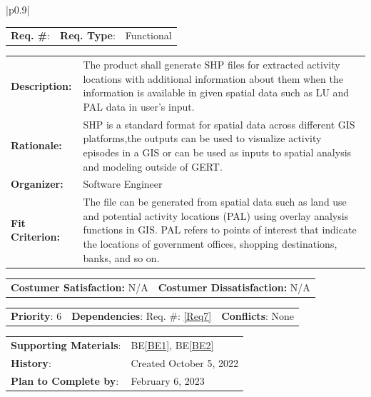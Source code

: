 \documentclass[12pt, titlepage]{article}
\newcommand{\beref}[1]{BE\ref{#1}}
\newcounter{reqnum}
\newcommand{\reqthereqnum}{\textbf{Req. \#}: \thereqnum}
\newcommand{\reqref}[1]{Req. \#: \ref{#1}}
\newenvironment{boxed}
    {\begin{center}
    \begin{tabular}{|p{0.9\textwidth}|}
    \hline\\
    }
    { 
    \\\\\hline
    \end{tabular} 
    \end{center}
    }
\begin{document}
\begin{boxed}
\begin{tabular}{l r r}
{reqnum} \reqthereqnum \label{Req9} & {\bf Req. Type}: &  Functional\\
\end{tabular}
\newline
\begin{tabular}{l p{11.5cm}}
    {\bf Description:} & The product shall generate SHP files for extracted activity locations with additional information about them when the information is available in given spatial data such as LU and PAL data in user's input.  \\
    {\bf Rationale:} & SHP is a standard format for spatial data across different GIS platforms,the outputs can be used to visualize activity episodes in a GIS or can be used as inputs to spatial analysis and modeling outside of GERT.\\
    {\bf Organizer:} & Software Engineer\\
    {\bf Fit Criterion:} & The file can be generated from spatial data such as land use and potential activity locations (PAL) using overlay analysis functions in GIS. PAL refers to points of interest that indicate the locations of government offices, shopping destinations, banks, and so on.\\
\end{tabular}
\begin{tabular}{l r}
{\bf Costumer Satisfaction:} N/A &  {\bf Costumer Dissatisfaction:}  N/A\\
\end{tabular}
\begin{tabular}{l r r}
    {\bf Priority}: 6 & {\bf Dependencies}:  \reqref{Req7}  & {\bf Conflicts}: None \\
\end{tabular}
\begin{tabular}{l l}
     {\bf Supporting Materials}:& 
     \beref{BE1}, \beref{BE2} \\ 
     {\bf History}: & Created October 5, 2022\\
     {\bf Plan to Complete by}: & February 6, 2023\\
\end{tabular}
\end{boxed}
\end{document}
